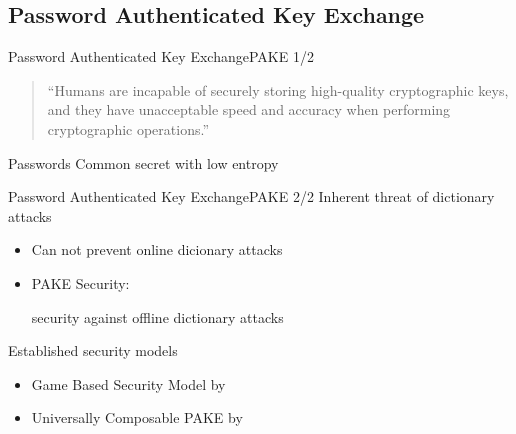 \documentclass[notes,xcolor=dvipsnames]{beamer}
\begin{document}
\subsection{Password Authenticated Key Exchange}

\begin{frame}{Password Authenticated Key Exchange}{PAKE 1/2}
	\begin{quote}
	``Humans are incapable of securely storing high-quality cryptographic keys, and they have unacceptable speed and accuracy when performing cryptographic operations.''~\cite{Kaufmann02}
	\end{quote}
	
	\pause
	\vspace*{2em}
	\begin{beamerboxesrounded}[upper=uppercol,lower=lowercol,shadow=true]{\centering Passwords}\centering
		Common secret with low entropy
	\end{beamerboxesrounded}
	
\end{frame}

\begin{frame}{Password Authenticated Key Exchange}{PAKE 2/2}
	Inherent threat of dictionary attacks
	\begin{itemize}
		\item Can not prevent online dicionary attacks
		\item PAKE Security:\\\begin{center} \alert{security against offline dictionary attacks}\end{center}
	\end{itemize}
	
	\vspace*{2em}
	Established security models
	\begin{itemize}
		\item Game Based Security Model by \cite{Bellare2000}%
		\item Universally Composable PAKE by \cite{Canetti2005}%
	\end{itemize}
\end{frame}
\end{document}
